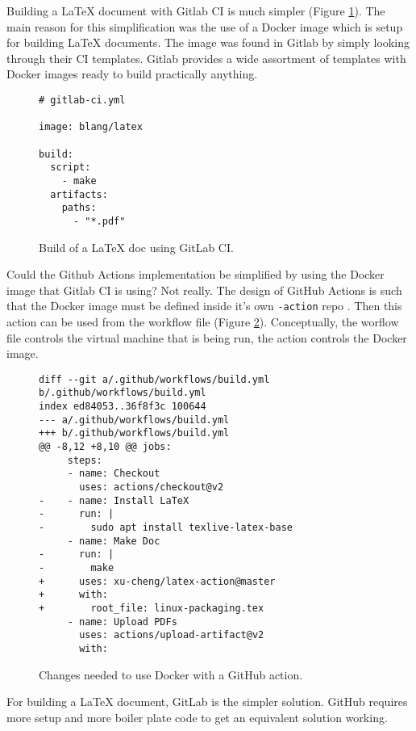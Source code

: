 \documentclass{article}
\begin{document}
Building a LaTeX document with Gitlab CI is much simpler
(Figure
\ref{fig:gitlab-ci-build})\autocite{gitlab-jmmahler-resume-gitlab-ci.yml}\autocite{gitlab-resume-build-533777462}.
The main reason for this simplification was the use of a
Docker image which is setup for building LaTeX documents.
The image was found in Gitlab by simply looking through their CI
templates.
Gitlab provides a wide assortment of templates with Docker images
ready to build practically anything.

\begin{figure}[!ht]
\begin{lstlisting}
# gitlab-ci.yml

image: blang/latex

build:
  script:
    - make
  artifacts:
    paths:
      - "*.pdf"
\end{lstlisting}
\label{fig:gitlab-ci-build}
\caption{Build of a LaTeX doc using GitLab CI.}
\end{figure}

Could the Github Actions implementation be simplified by using the
Docker image that Gitlab CI is using?
Not really.
The design of GitHub Actions is such that the Docker image must be
defined inside it's own \verb+-action+ repo
\autocite{github-action-docker}.
Then this action can be used from the workflow file
(Figure \ref{fig:github-action-with-docker}).
Conceptually, the worflow file controls the virtual machine that
is being run, the action controls the Docker image.

\begin{figure}[!ht]
\begin{lstlisting}
diff --git a/.github/workflows/build.yml b/.github/workflows/build.yml
index ed84053..36f8f3c 100644
--- a/.github/workflows/build.yml
+++ b/.github/workflows/build.yml
@@ -8,12 +8,10 @@ jobs:
     steps:
     - name: Checkout
       uses: actions/checkout@v2
-    - name: Install LaTeX
-      run: |
-        sudo apt install texlive-latex-base
     - name: Make Doc
-      run: |
-        make
+      uses: xu-cheng/latex-action@master
+      with:
+        root_file: linux-packaging.tex
     - name: Upload PDFs
       uses: actions/upload-artifact@v2
       with:
\end{lstlisting}
\label{fig:github-action-with-docker}
\caption{Changes needed to use Docker with a GitHub action.}
\end{figure}

For building a LaTeX document, GitLab is the simpler solution.
GitHub requires more setup and more boiler plate code to get
an equivalent solution working.

\clearpage
\printbibliography[heading=bibintoc]
\end{document}
